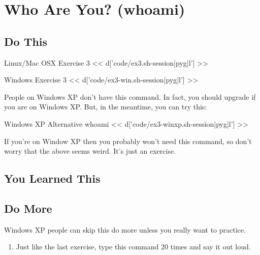 \chapter{Who Are You? (whoami)}

\section{Do This}

\begin{code}{Linux/Mac OSX Exercise 3}
<< d['code/ex3.sh-session|pyg|l'] >>
\end{code}

\begin{code}{Windows Exercise 3}
<< d['code/ex3-win.sh-session|pyg|l'] >>
\end{code}

People on Windows XP don't have this command.  In fact, you should upgrade
if you are on Windows XP. But, in the meantime, you can try this:

\begin{code}{Windows XP Alternative whoami}
<< d['code/ex3-winxp.sh-session|pyg|l'] >>
\end{code}

If you're on Window XP then you probably won't need this command, so don't
worry that the above seems weird.  It's just an exercise.

\section{You Learned This}

\section{Do More}

Windows XP people can skip this do more unless you really want to practice.

\begin{enumerate}
\item Just like the last exercise, type this command 20 times and say it out loud.
\end{enumerate}


